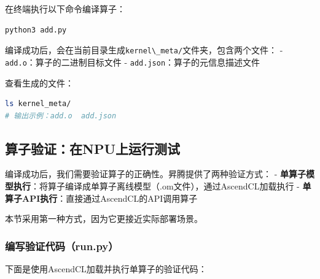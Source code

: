 在终端执行以下命令编译算子：

\begin{lstlisting}[language=bash]
python3 add.py
\end{lstlisting}

编译成功后，会在当前目录生成\passthrough{\lstinline!kernel\_meta/!}文件夹，包含两个文件：
- \passthrough{\lstinline!add.o!}：算子的二进制目标文件 -
\passthrough{\lstinline!add.json!}：算子的元信息描述文件

查看生成的文件：

\begin{lstlisting}[language=bash]
ls kernel_meta/
# 输出示例：add.o  add.json
\end{lstlisting}

\subsection{算子验证：在NPU上运行测试}\label{src-book-chapter7-h26}

编译成功后，我们需要验证算子的正确性。昇腾提供了两种验证方式： -
\textbf{单算子模型执行}：将算子编译成单算子离线模型（.om文件），通过AscendCL加载执行
- \textbf{单算子API执行}：直接通过AscendCL的API调用算子

本节采用第一种方式，因为它更接近实际部署场景。

\subsubsection{编写验证代码（run.py）}\label{src-book-chapter7-h27}

下面是使用AscendCL加载并执行单算子的验证代码：

